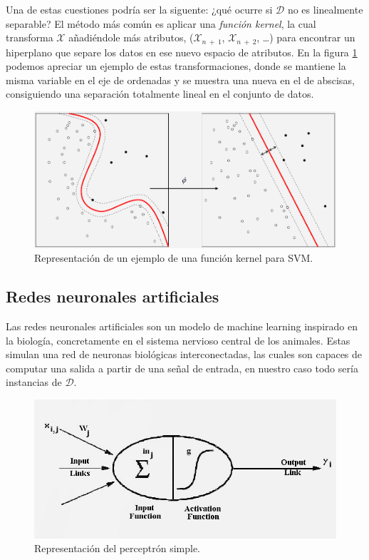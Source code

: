 Una de estas cuestiones podría ser la siguente: ¿qué ocurre si $\mathcal{D}$ no es linealmente separable? El método más común es aplicar una \emph{función kernel}, la cual transforma $\mathcal{X}$ añadiéndole más atributos, ($\mathcal{X}_{n\:+\:1}$, $\mathcal{X}_{n\:+\:2}$, \dots) para encontrar un hiperplano que separe los datos en ese nuevo espacio de atributos. En la figura \ref{fig:3.3} podemos apreciar un ejemplo de estas transformaciones, donde se mantiene la misma variable en el eje de ordenadas y se muestra una nueva en el de abscisas, consiguiendo una separación totalmente lineal en el conjunto de datos.

\begin{figure}[ht]
  \centering
  \includegraphics[width=120mm]{figures/ch_03/svm_kernel.png}
  \caption{Representación de un ejemplo de una función kernel para SVM. \cite{wikipedia2014support}}
  \label{fig:3.3}
\end{figure}

\subsection{Redes neuronales artificiales} \label{subsec:3.1.3}

Las redes neuronales artificiales son un modelo de machine learning inspirado en la biología, concretamente en el sistema nervioso central de los animales. Estas simulan una red de neuronas biológicas interconectadas, las cuales son capaces de computar una salida a partir de una señal de entrada, en nuestro caso todo sería instancias de $\mathcal{D}$.

\begin{figure}[ht]
  \centering
  \includegraphics[width=120mm]{figures/ch_03/perceptron_example.jpg}
  \caption{Representación del perceptrón simple. \cite{kendall2001introduction}}
  \label{fig:3.4}
\end{figure}

